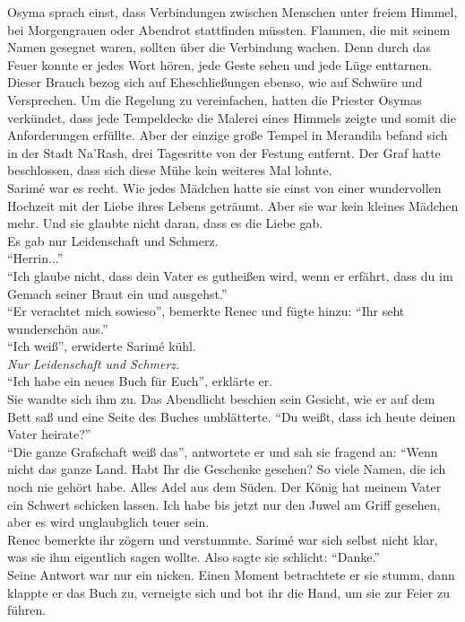 Osyma sprach einst, dass Verbindungen zwischen Menschen unter freiem Himmel, bei Morgengrauen oder 
Abendrot stattfinden müssten. Flammen, die mit seinem Namen gesegnet waren, sollten über die 
Verbindung wachen. Denn durch das Feuer konnte er jedes Wort hören, jede Geste sehen und jede Lüge 
enttarnen. Dieser Brauch bezog sich auf Eheschließungen ebenso, wie auf Schwüre und Versprechen. Um 
die Regelung zu vereinfachen, hatten die Priester Osymas verkündet, dass jede Tempeldecke die 
Malerei eines Himmels zeigte und somit die Anforderungen erfüllte. Aber der einzige große Tempel in 
Merandila befand sich in der Stadt Na'Rash, drei Tagesritte von der Festung entfernt. Der Graf hatte 
beschlossen, dass sich diese Mühe kein weiteres Mal lohnte.\\
Sarimé war es recht. Wie jedes Mädchen hatte sie einst von einer wundervollen Hochzeit mit der 
Liebe ihres Lebens geträumt. Aber sie war kein kleines Mädchen mehr. Und sie glaubte nicht daran, 
dass es die Liebe gab.\\
Es gab nur Leidenschaft und Schmerz.\\
``Herrin...''\\
``Ich glaube nicht, dass dein Vater es gutheißen wird, wenn er erfährt, dass du im Gemach seiner 
Braut ein und ausgehst.''\\
``Er verachtet mich sowieso'', bemerkte Renec und fügte hinzu: ``Ihr seht wunderschön aus.''\\
``Ich weiß'', erwiderte Sarimé kühl.\\
\textit{Nur Leidenschaft und Schmerz.}\\
``Ich habe ein neues Buch für Euch'', erklärte er.\\
Sie wandte sich ihm zu. Das Abendlicht beschien sein Gesicht, wie er auf dem Bett saß und eine 
Seite des Buches umblätterte. ``Du weißt, dass ich heute deinen Vater heirate?''\\
``Die ganze Grafschaft weiß das'', antwortete er und sah sie fragend an: ``Wenn nicht das ganze 
Land. Habt Ihr die Geschenke gesehen? So viele Namen, die ich noch nie gehört habe. Alles Adel aus 
dem Süden. Der König hat meinem Vater ein Schwert schicken lassen. Ich habe bis jetzt nur den 
Juwel am Griff gesehen, aber es wird unglaubglich teuer sein.\\
Renec bemerkte ihr zögern und verstummte. Sarimé war sich selbst nicht klar, was sie ihm eigentlich 
sagen wollte. Also sagte sie schlicht: ``Danke.''\\
Seine Antwort war nur ein nicken. Einen Moment betrachtete er sie stumm, dann klappte er das Buch 
zu, verneigte sich und bot ihr die Hand, um sie zur Feier zu führen.


